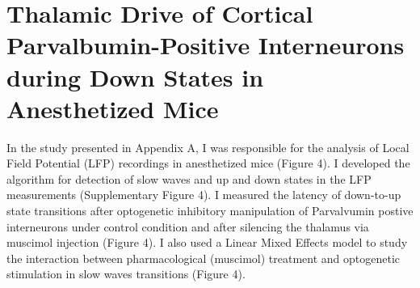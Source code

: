
\chapter{Thalamic Drive of Cortical Parvalbumin-Positive Interneurons during Down States in Anesthetized Mice} %
\label{paper_pasquale} %
In the study presented in Appendix A, I was responsible for the analysis of Local Field Potential (LFP) recordings in anesthetized mice (Figure 4).
I developed the algorithm for detection of slow waves and up and down states in the LFP measurements (Supplementary Figure 4). 
I measured the latency of down-to-up state transitions after optogenetic inhibitory manipulation of Parvalvumin postive interneurons under control condition and after silencing the thalamus via muscimol injection (Figure 4).
I also used a Linear Mixed Effects model to study the interaction between pharmacological (muscimol) treatment and optogenetic stimulation in slow waves transitions (Figure 4). 


